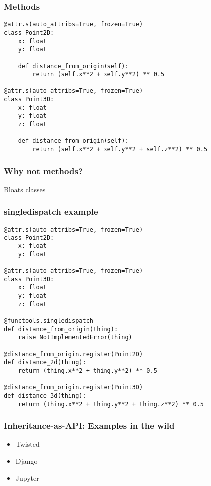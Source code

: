 \begin{frame}[fragile]
\frametitle{Methods}

\begin{lstlisting}
@attr.s(auto_attribs=True, frozen=True)
class Point2D:
    x: float
    y: float

    def distance_from_origin(self):
        return (self.x**2 + self.y**2) ** 0.5

@attr.s(auto_attribs=True, frozen=True)
class Point3D:
    x: float
    y: float
    z: float

    def distance_from_origin(self):
        return (self.x**2 + self.y**2 + self.z**2) ** 0.5
\end{lstlisting}

\end{frame}

\begin{frame}[fragile]
\frametitle{Why not methods?}

Bloats classes

\end{frame}

\begin{frame}[fragile]
\frametitle{singledispatch example}

\begin{lstlisting}
@attr.s(auto_attribs=True, frozen=True)
class Point2D:
    x: float
    y: float

@attr.s(auto_attribs=True, frozen=True)
class Point3D:
    x: float
    y: float
    z: float

@functools.singledispatch
def distance_from_origin(thing):
    raise NotImplementedError(thing)

@distance_from_origin.register(Point2D)
def distance_2d(thing):
    return (thing.x**2 + thing.y**2) ** 0.5

@distance_from_origin.register(Point3D)
def distance_3d(thing):
    return (thing.x**2 + thing.y**2 + thing.z**2) ** 0.5
\end{lstlisting}

\end{frame}


\begin{frame}[fragile]
\frametitle{Inheritance-as-API: Examples in the wild}

\begin{itemize}
\item Twisted \pause
\item Django \pause
\item Jupyter
\end{itemize}

\end{frame}

